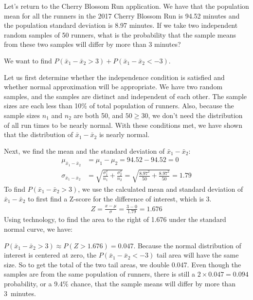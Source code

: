 \begin{examplewrap}
\begin{nexample}{
  Let's return to the Cherry Blossom Run application.
  We have that the population mean for all the runners in the 2017 Cherry Blossom Run is 94.52 minutes and the population standard deviation is 8.97 minutes.  If we take two independent random samples of 50 runners, what is the probability that the sample means from these two samples will differ by more than 3 minutes?}

We want to find
$P(\bar{x}_1 - \bar{x}_2> 3) + P(\bar{x}_1 - \bar{x}_2< -3)$.

Let us first determine whether the independence condition is satisfied and whether normal approximation will be appropriate.  We have two random samples, and the samples are distinct and independent of each other.  The sample sizes are each less than 10\% of total population of runners.  Also, because the sample sizes $n_1$ and $n_2$ are both 50, and $50 \ge 30$, we don't need the distribution of all run times to be nearly normal.  With these conditions met, we have shown that the distribution of $\bar{x}_1-\bar{x}_2$ is nearly normal.

Next, we find the mean and the standard deviation of $\bar{x}_1-\bar{x}_2$:
\begin{align*}
\mu_{\bar{x}_1-\bar{x}_2} &= \mu_1-\mu_2 = 94.52-94.52 = 0 \\
\sigma_{\bar{x}_1-\bar{x}_2}
  &= \sqrt{\frac{\sigma_1^2}{n_1} + \frac{\sigma_2^2}{n_2}}
  = \sqrt{\frac{8.97^2}{50} + \frac{8.97^2}{50}}= 1.79
\end{align*}
To find $P(\bar{x}_1-\bar{x}_2>3)$, we use the calculated mean and standard deviation of $\bar{x}_1-\bar{x}_2$ to first find a Z-score for the difference of interest, which is 3.
\begin{align*}
Z = \frac{x - \mu}{\sigma} = \frac{3 - 0}{1.79}=1.676
\end{align*}
Using technology, to find the area to the right of 1.676 under the standard normal curve, we have:

$P(\bar{x}_1-\bar{x}_2>3)\approx P(Z > 1.676) = 0.047$.
Because the normal distribution of interest is centered at zero,
the $P(\bar{x}_1 - \bar{x}_2< -3)$ tail area will have the same size.
So to get the total of the two tail areas, we double 0.047.
Even though the samples are from the same population of runners,
there is still a $2\times 0.047 = 0.094$ probability, or a 9.4\% chance, that the sample means will differ by more than 3~minutes.
\end{nexample}
\end{examplewrap}


